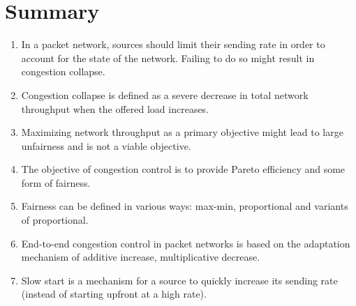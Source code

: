 \section{Summary}\begin{enumerate}
    \item In a packet network, sources should limit their sending rate in order
    to account for the state of the network. Failing
    to do so might result in congestion collapse.
    \item Congestion collapse is defined as a severe decrease in total
    network throughput when the offered load increases.
    \item Maximizing network throughput as a primary objective might lead to
large unfairness and is not a viable objective.
  \item The
objective of congestion control is to provide Pareto efficiency and
some form of fairness.


\item Fairness can be defined in various ways: max-min,
proportional and variants of proportional.

\item End-to-end congestion control in packet networks is based on the adaptation mechanism of additive increase,
multiplicative decrease.

\item Slow start is a mechanism for a source to quickly increase its sending rate (instead of starting upfront at a high rate).
\end{enumerate}
%
%
%
%
%
%
%
%
%
%
%
